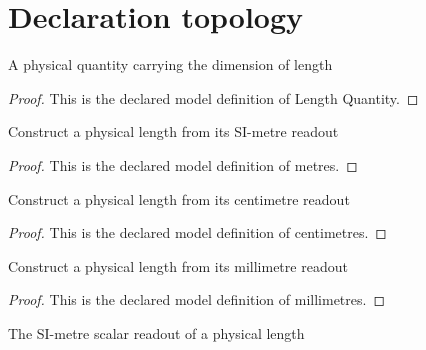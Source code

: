 \section{Declaration topology}
\begin{definition}
  \label{def:physics:phyx-mini-0113:phyxminiproblems-problemphyxmini0113-lengthquantity}
  A physical quantity carrying the dimension of length
\end{definition}
\begin{proof}
  This is the declared model definition of Length Quantity.
\end{proof}
\begin{definition}[metres]
  \label{def:physics:phyx-mini-0113:phyxminiproblems-problemphyxmini0113-metres}
  Construct a physical length from its SI-metre readout
\end{definition}
\begin{proof}
  This is the declared model definition of metres.
\end{proof}
\begin{definition}[centimetres]
  \label{def:physics:phyx-mini-0113:phyxminiproblems-problemphyxmini0113-centimetres}
  Construct a physical length from its centimetre readout
\end{definition}
\begin{proof}
  This is the declared model definition of centimetres.
\end{proof}
\begin{definition}[millimetres]
  \label{def:physics:phyx-mini-0113:phyxminiproblems-problemphyxmini0113-millimetres}
  Construct a physical length from its millimetre readout
\end{definition}
\begin{proof}
  This is the declared model definition of millimetres.
\end{proof}
\begin{definition}
  \label{def:physics:phyx-mini-0113:phyxminiproblems-problemphyxmini0113-metrereadout}
  The SI-metre scalar readout of a physical length
\end{definition}

